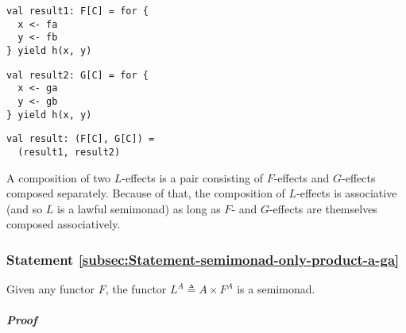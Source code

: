 \begin{center}
\begin{minipage}[t]{0.3\columnwidth}%
\begin{lstlisting}
val result1: F[C] = for {
  x <- fa
  y <- fb
} yield h(x, y)
\end{lstlisting}
%
\end{minipage}\hfill{} %
\begin{minipage}[t]{0.3\columnwidth}%
\begin{lstlisting}
val result2: G[C] = for {
  x <- ga
  y <- gb
} yield h(x, y)
\end{lstlisting}
%
\end{minipage}\hfill{} %
\begin{minipage}[t]{0.3\columnwidth}%
\begin{lstlisting}
val result: (F[C], G[C]) =
  (result1, result2)
\end{lstlisting}
%
\end{minipage}\vspace{-0.35\baselineskip}
\par\end{center}

A composition of two $L$-effects is a pair consisting of $F$-effects
and $G$-effects composed separately. Because of that, the composition
of $L$-effects is associative (and so $L$ is a lawful semimonad)
as long as $F$- and $G$-effects are themselves composed associatively.

\subsubsection{Statement \label{subsec:Statement-semimonad-only-product-a-ga}\ref{subsec:Statement-semimonad-only-product-a-ga}}

Given any functor $F$, the functor $L^{A}\triangleq A\times F^{A}$
is a semimonad.

\subparagraph{Proof}


